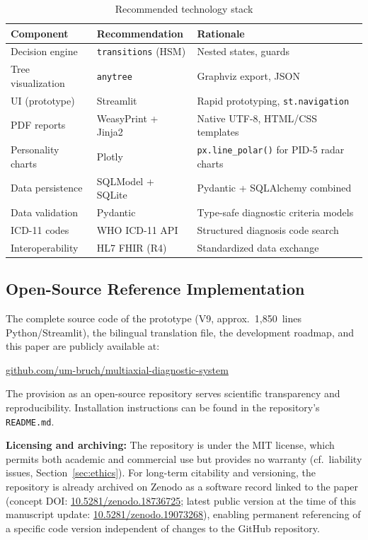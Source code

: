 \documentclass[11pt,a4paper]{article}
\begin{document}
\begin{table}[H]
\centering
\caption{Recommended technology stack}
\label{tab:techstack}
\begin{tabularx}{\textwidth}{lXl}
\toprule
\textbf{Component} & \textbf{Recommendation} & \textbf{Rationale} \\
\midrule
Decision engine & \texttt{transitions} (HSM) & Nested states, guards \\
Tree visualization & \texttt{anytree} & Graphviz export, JSON \\
UI (prototype) & Streamlit & Rapid prototyping, \texttt{st.navigation} \\
PDF reports & WeasyPrint + Jinja2 & Native UTF-8, HTML/CSS templates \\
Personality charts & Plotly & \texttt{px.line\_polar()} for PID-5 radar charts \\
Data persistence & SQLModel + SQLite & Pydantic + SQLAlchemy combined \\
Data validation & Pydantic & Type-safe diagnostic criteria models \\
ICD-11 codes & WHO ICD-11 API & Structured diagnosis code search \\
Interoperability & HL7 FHIR (R4) & Standardized data exchange \\
\bottomrule
\end{tabularx}
\end{table}

\subsection{Open-Source Reference Implementation}

The complete source code of the prototype (V9, approx.\ 1,850~lines Python/Streamlit), the bilingual translation file, the development roadmap, and this paper are publicly available at:

\begin{center}
\href{https://github.com/um-bruch/multiaxial-diagnostic-system}{github.com/um-bruch/multiaxial-diagnostic-system}
\end{center}

\noindent The provision as an open-source repository serves scientific transparency and reproducibility. Installation instructions can be found in the repository's \texttt{README.md}.

\textbf{Licensing and archiving:} The repository is under the MIT license, which permits both academic and commercial use but provides no warranty (cf.\ liability issues, Section~\ref{sec:ethics}). For long-term citability and versioning, the repository is already archived on Zenodo as a software record linked to the paper (concept DOI: \href{https://doi.org/10.5281/zenodo.18736725}{10.5281/zenodo.18736725}; latest public version at the time of this manuscript update: \href{https://doi.org/10.5281/zenodo.19073268}{10.5281/zenodo.19073268}), enabling permanent referencing of a specific code version independent of changes to the GitHub repository.
\end{document}
